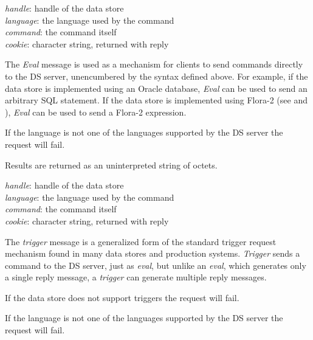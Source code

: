 {
\metP
    {\em handle}: handle of the data store\\
    {\em language}: the language used by the command\\
    {\em command}: the command itself\\
    {\em cookie}: character string, returned with reply
    
\metD
    The {\em Eval} message is used as a mechanism for clients to send
    commands directly to the DS server, unencumbered by the
    syntax defined above. For example, if the data store is
    implemented using an Oracle database, {\em Eval} can be used to
    send an arbitrary SQL statement. If the data store is implemented
    using Flora-2 (see \cite{Flora2} and \cite{XSB}), {\em Eval} can 
    be used to send a Flora-2 expression.

    If the language is not one of the languages supported by the DS
    server the request will fail.

    Results are returned as an uninterpreted string of octets.  
}

{
\metP
    {\em handle}: handle of the data store\\
    {\em language}: the language used by the command\\
    {\em command}: the command itself\\
    {\em cookie}: character string, returned with reply
    
\metD
    The {\em trigger} message is a generalized form of the standard
    trigger request mechanism found in many data stores and production
    systems. {\em Trigger} sends a command to the DS server,
    just as {\em eval}, but unlike an {\em eval}, which generates only
    a single reply message, a {\em trigger} can generate multiple
    reply messages. 


    If the data store does not support triggers the request will fail.

    If the language is not one of the languages supported by the DS
    server the request will fail.
}

